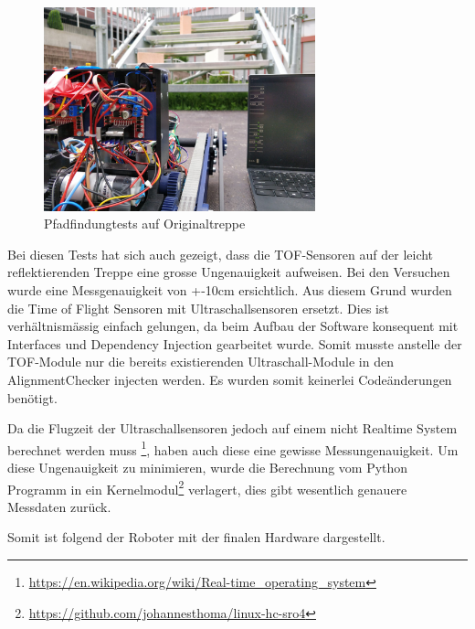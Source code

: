    \begin{figure}[H]
  \includegraphics[width=0.7\textwidth]{img/Sprint3/pren2_tests_treppe.jpeg}
  \centering
  \caption{Pfadfindungtests auf Originaltreppe}
  \label{fig:Tests auf Originaltreppe}
  \end{figure}
  
  Bei diesen Tests hat sich auch gezeigt, dass die TOF-Sensoren auf der leicht reflektierenden Treppe eine grosse Ungenauigkeit aufweisen. Bei den Versuchen wurde eine Messgenauigkeit von +-10cm ersichtlich. Aus diesem Grund wurden die Time of Flight Sensoren mit Ultraschallsensoren ersetzt. Dies ist verhältnismässig einfach gelungen, da beim Aufbau der Software konsequent mit Interfaces und Dependency Injection gearbeitet wurde. Somit musste anstelle der TOF-Module nur die bereits existierenden Ultraschall-Module in den AlignmentChecker injecten werden. Es wurden somit keinerlei Codeänderungen benötigt.
  
  Da die Flugzeit der Ultraschallsensoren jedoch auf einem nicht Realtime System berechnet werden muss 
\footnote{\url{https://en.wikipedia.org/wiki/Real-time_operating_system}}, haben auch diese eine gewisse Messungenauigkeit.
  Um diese Ungenauigkeit zu minimieren, wurde die Berechnung vom Python Programm in ein Kernelmodul\footnote{
    \url{https://github.com/johannesthoma/linux-hc-sro4}
  } verlagert, dies gibt wesentlich genauere Messdaten zurück.
  
 Somit ist folgend der Roboter mit der finalen Hardware dargestellt.
 
